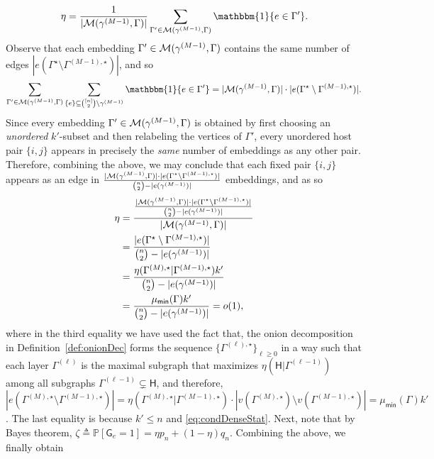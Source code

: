 \documentclass[12pt]{article}
\newcommand{\Ind}{\mathbbm{1}}
\newcommand {\pr} {\mathbb{P}}
\newcommand{\calM}{{\cal M}}
\newcommand{\s}[1]{\mathsf{#1}}
\begin{document}
\begin{align}
    \eta= \frac{1}{|\calM(\gamma^{(M-1)},\Gamma)|}\sum_{\Gamma'\in\calM(\gamma^{(M-1)},\Gamma)}\Ind\{e\in\Gamma'\}.
\end{align}
Observe that each embedding $\Gamma'\in\calM(\gamma^{(M-1)},\Gamma)$ contains the same number of edges $|e(\Gamma^\star\setminus\Gamma^{(M-1),\star})|$, and so
\begin{align}
    \sum_{\Gamma'\in\calM(\gamma^{(M-1)},\Gamma)}\sum_{\{e\}\subseteq\binom{[n]}{2}\setminus\gamma^{(M-1)}} \Ind\{e\in\Gamma'\} = |\calM(\gamma^{(M-1)},\Gamma)|\cdot|e(\Gamma^\star\setminus\Gamma^{(M-1),\star})|.
\end{align}
Since every embedding $\Gamma'\in\calM(\gamma^{(M-1)},\Gamma)$ is obtained by first choosing an \emph{unordered} $k'$-subset and then relabeling the vertices of $\Gamma'$, every unordered host pair $\{i,j\}$ appears in precisely the \emph{same} number of embeddings as any other pair. Therefore, combining the above, we may conclude that each fixed pair $\{i,j\}$ appears as an edge in $\frac{|\calM(\gamma^{(M-1)},\Gamma)|\cdot|e(\Gamma^\star\setminus\Gamma^{(M-1),\star})|}{\binom{n}{2}-|e(\gamma^{(M-1)})|}$ embeddings, and as so
\begin{align}
    \eta &=\frac{\frac{|\calM(\gamma^{(M-1)},\Gamma)|\cdot|e(\Gamma^\star\setminus\Gamma^{(M-1),\star})|}{\binom{n}{2}-|e(\gamma^{(M-1)})|}}
       {|\calM(\gamma^{(M-1)},\Gamma)|}\\
       & = \frac{|e(\Gamma^\star\setminus\Gamma^{(M-1),\star})|}{\binom{n}{2}-|e(\gamma^{(M-1)})|}\\
       & = \frac{\eta(\Gamma^{(M),\star}\vert\Gamma^{(M-1),\star})k'}{\binom{n}{2}-|e(\gamma^{(M-1)})|} \\
       &=\frac{\mu_{\s{min}}(\Gamma)k'}{\binom{n}{2}-|e(\gamma^{(M-1)})|} = o(1),\label{eqn:etaDef}
\end{align}
where in the third equality we have used the fact that, the onion decomposition in Definition~\ref{def:onionDec} forms the sequence $\{\Gamma^{(\ell),\star}\}_{\ell\geq0}$ in a way such that each layer $\Gamma^{(\ell)}$ is the maximal subgraph that maximizes $\eta(\s{H} \vert \Gamma^{(\ell-1)})$ among all subgraphs $\Gamma^{(\ell-1)}\subsetneq \s{H}$, and therefore, $|e(\Gamma^{(M),\star} \setminus \Gamma^{(M-1),\star})| = \eta(\Gamma^{(M),\star} \vert \Gamma^{(M-1),\star})\cdot|v(\Gamma^{(M),\star}) \setminus v(\Gamma^{(M-1),\star})| = \mu_{\s{min}}(\Gamma)k'$. The last equality is because $k'\leq n$ and \eqref{eq:condDenseStat}. Next, note that by Bayes theorem, $\zeta\triangleq\pr[\s{G}_e=1]=\eta p_n + (1-\eta)q_n$. Combining the above, we finally obtain
\end{document}
